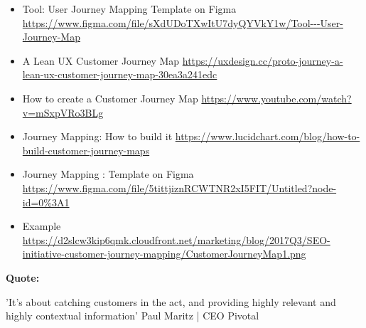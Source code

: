 \begin{itemize}
\item Tool: User Journey Mapping Template on Figma \url{https://www.figma.com/file/sXdUDoTXwItU7dyQYVkY1w/Tool---User-Journey-Map}
\item A Lean UX Customer Journey Map \url{https://uxdesign.cc/proto-journey-a-lean-ux-customer-journey-map-30ea3a241edc}
\item How to create a Customer Journey Map \url{https://www.youtube.com/watch?v=mSxpVRo3BLg}
\item Journey Mapping: How to build it \url{https://www.lucidchart.com/blog/how-to-build-customer-journey-maps}
\item Journey Mapping : Template on Figma \url{https://www.figma.com/file/5tittjiznRCWTNR2xI5FIT/Untitled?node-id=0%3A1}
\item Example \url{https://d2slcw3kip6qmk.cloudfront.net/marketing/blog/2017Q3/SEO-initiative-customer-journey-mapping/CustomerJourneyMap1.png}
\end{itemize}

\textbf{Quote:}

'It's about catching customers in the act, and providing highly relevant and highly contextual information' Paul Maritz | CEO Pivotal

